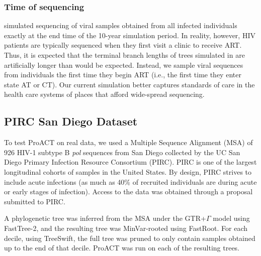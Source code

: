 \documentclass[a4paper,11pt]{article}
\newcommand{\authorcite}[1]{\citeauthor{#1}\supercite{#1}}
\newcommand{\PLWH}{sample\xspace}
\begin{document}
\subsubsection{Time of sequencing}
\authorcite{Moshiri2018} simulated sequencing of viral samples obtained from all infected individuals exactly at the end time of the 10-year simulation period.
In reality, however,
HIV patients are typically sequenced when they first visit a clinic to receive ART.
Thus, it is expected that the terminal branch lengths of trees simulated in \authorcite{Moshiri2018} are artificially longer than would be expected.
Instead,
we sample viral sequences from individuals the first time they begin ART (i.e., the first time they enter state AT or CT).
Our current simulation better captures standards of care in the health care systems of places that %
afford wide-spread sequencing. 


\subsection{PIRC San Diego Dataset}
To test ProACT on real data, we used a Multiple Sequence Alignment (MSA) of 926 HIV-1 subtype B \textit{pol} sequences from San Diego collected by the UC San Diego Primary Infection Resource Consortium (PIRC). 
PIRC  is one of the largest longitudinal cohorts of \PLWH{s} in the United States. By design, PIRC strives to include acute infections (as much as 40\% of recruited individuals are during acute or early stages of infection).  
Access to the data was obtained through a proposal submitted to PIRC.

A phylogenetic tree was inferred from the MSA under the GTR+$\Gamma$ model using FastTree-2,\supercite{Price2010} and the resulting tree was MinVar-rooted using FastRoot.\supercite{Mai2017} For each decile, using TreeSwift,\supercite{Moshiri2020} the full tree was pruned to only contain samples obtained up to the end of that decile. ProACT was run on each of the resulting trees.
\end{document}
